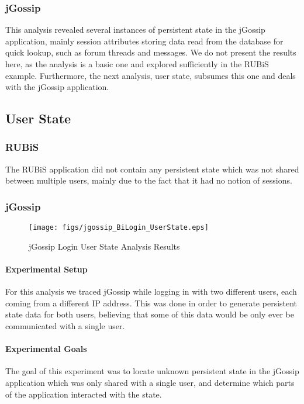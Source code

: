 \documentclass[msc,oneside]{ubcthesis}
\begin{document}
\subsubsection{jGossip} 

This analysis revealed several instances of persistent state in the jGossip application, mainly session attributes storing data read from the database for quick lookup, such as forum threads and messages. We do not present the results here, as the analysis is a basic one and explored sufficiently in the RUBiS example. Furthermore, the next analysis, user state, subsumes this one and deals with the jGossip application.

\subsection{User State}
\label{ana:user}
\subsubsection{RUBiS}

The RUBiS application did not contain any persistent state which was not shared between multiple users, mainly due to the fact that it had no notion of sessions.

\subsubsection{jGossip}

\begin{sidewaysfigure}
\centering
\scalebox{0.44}
{\texttt{[image: figs/jgossip\_BiLogin\_UserState.eps]}}
\caption{jGossip Login User State Analysis Results} 
\label{fig:loginstate}
\end{sidewaysfigure}

\paragraph{Experimental Setup}
For this analysis we traced jGossip while logging in with two different users, each coming from a different IP address. This was done in order to generate persistent state data for both users, believing that some of this data would be only ever be communicated with a single user.

\paragraph{Experimental Goals}
The goal of this experiment was to locate unknown persistent state in the jGossip application which was only shared with a single user, and determine which parts of the application interacted with the state.
\end{document}
